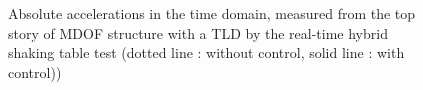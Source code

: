 \begin{figure}[!ht]
\centering
\caption{Absolute accelerations in the time domain, measured from the top story of MDOF structure with a TLD by the real-time hybrid shaking table test (dotted line : without control, solid line : with control))
}
\label{fig:3-10}
\end{figure}


